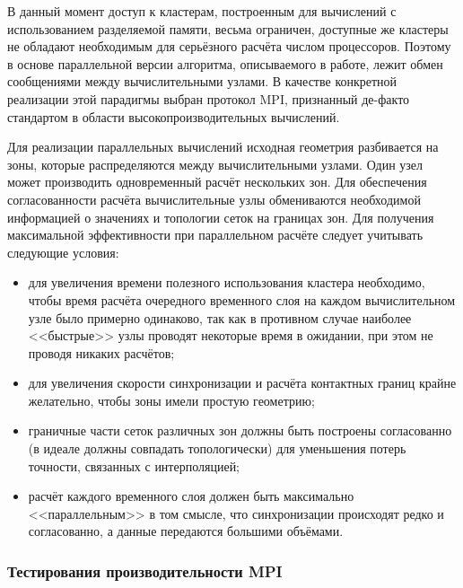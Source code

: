 В данный момент доступ к кластерам, построенным для вычислений с использованием
разделяемой памяти, весьма ограничен, доступные же кластеры не обладают
необходимым для серьёзного расчёта числом процессоров. Поэтому в основе
параллельной версии алгоритма, описываемого в работе, лежит обмен сообщениями
между вычислительными узлами. В качестве конкретной реализации этой парадигмы
выбран протокол MPI, признанный де-факто стандартом в области
высокопроизводительных вычислений.

Для реализации параллельных вычислений исходная геометрия разбивается на зоны, которые распределяются между вычислительными узлами. Один узел может производить одновременный расчёт нескольких зон. Для обеспечения согласованности расчёта вычислительные узлы обмениваются необходимой информацией о значениях и топологии сеток на границах зон. Для получения максимальной эффективности при параллельном расчёте следует учитывать следующие условия:
\begin{itemize}
	\item для увеличения времени полезного использования кластера необходимо, чтобы время расчёта очередного временного слоя на каждом вычислительном узле было примерно одинаково, так как в противном случае наиболее <<быстрые>> узлы проводят некоторые время в ожидании, при этом не проводя никаких расчётов;
	\item для увеличения скорости синхронизации и расчёта контактных границ крайне желательно, чтобы зоны имели простую геометрию;
	\item граничные части сеток различных зон должны быть построены согласованно (в идеале должны совпадать топологически) для уменьшения потерь точности, связанных с интерполяцией;
	\item расчёт каждого временного слоя должен быть максимально <<параллельным>> в том смысле, что синхронизации происходят редко и согласованно, а данные передаются большими объёмами.
\end{itemize}

\subsubsection{Тестирования производительности MPI}

